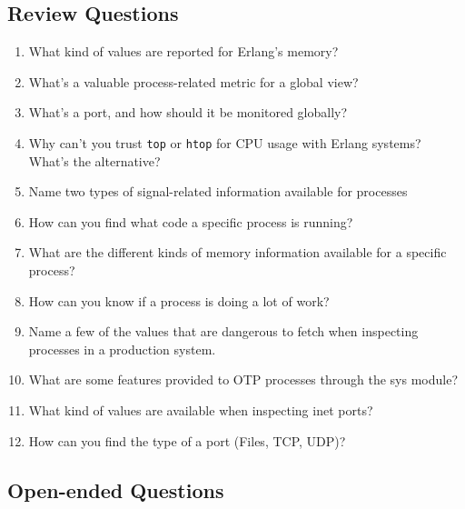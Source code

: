 \documentclass[11pt, oneside]{book}   	%
\newcommand{\app}[1]{\Verb`#1`}
\begin{document}
\subsection{Review Questions}

\begin{enumerate}
	\item What kind of values are reported for Erlang's memory?
	\item What's a valuable process-related metric for a global view?
	\item What's a port, and how should it be monitored globally?
	\item Why can't you trust \app{top} or \app{htop} for CPU usage with Erlang systems? What's the alternative?
	\item Name two types of signal-related information available for processes
	\item How can you find what code a specific process is running?
	\item What are the different kinds of memory information available for a specific process?
	\item How can you know if a process is doing a lot of work?
	\item Name a few of the values that are dangerous to fetch when inspecting processes in a production system.
	\item What are some features provided to OTP processes through the sys module?
	\item What kind of values are available when inspecting inet ports?
	\item How can you find the type of a port (Files, TCP, UDP)?
\end{enumerate}

\subsection{Open-ended Questions}
\end{document}
